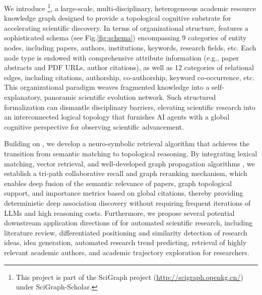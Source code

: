 We introduce \textbf{\ours}\footnote{This project is part of the SciGraph project (\url{http://scigraph.openkg.cn/}) under SciGraph-Scholar.}, a large-scale, multi-disciplinary, heterogeneous academic resource knowledge graph designed to provide a topological cognitive substrate for accelerating scientific discovery.
In terms of organizational structure, {\ours} features a sophisticated schema (see Fig.\ref{fig:schema}) encompassing 9 categories of entity nodes, including papers, authors, institutions, keywords, research fields, etc.
Each node type is endowed with comprehensive attribute information (e.g., paper abstracts and PDF URLs, author citations), as well as 12 categories of relational edges, including citations, authorship, co-authorship, keyword co-occurrence, etc.
This organizational paradigm weaves fragmented knowledge into a self-explanatory, panoramic scientific evolution network.
Such structured formalization can dismantle disciplinary barriers, elevating scientific research into an interconnected logical topology that furnishes AI agents with a global cognitive perspective for observing scientific advancement.

Building on {\ours}, we develop a neuro-symbolic retrieval algorithm that achieves the transition from semantic matching to topological reasoning.
By integrating lexical matching, vector retrieval, and well-developed graph propagation algorithms \citep{rwr}, we establish a tri-path collaborative recall and graph reranking mechanism, which enables deep fusion of the semantic relevance of papers, graph topological support, and importance metrics based on global citations, thereby providing deterministic deep association discovery without requiring frequent iterations of LLMs and high reasoning costs.
Furthermore, we propose several potential downstream application directions of {\ours} for automated scientific research, including literature review, differentiated positioning and similarity detection of research ideas, idea generation, automated research trend predicting, retrieval of highly relevant academic authors, and academic trajectory exploration for researchers.

